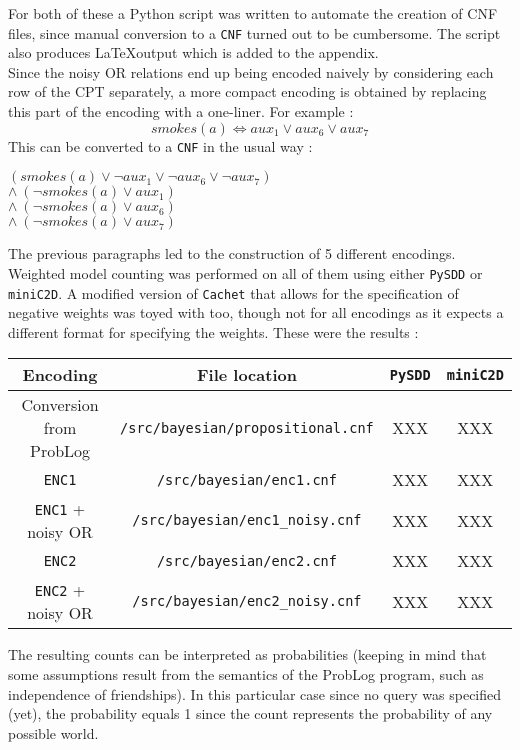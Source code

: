 \noindent For both of these a Python script was written to automate the creation of CNF files, since manual conversion to a \texttt{CNF} turned out to be cumbersome. The script also produces \LaTeX output which is added to the appendix.\\

\noindent Since the noisy OR relations end up being encoded naively by considering each row of the CPT separately, a more compact encoding is obtained by replacing this part of the encoding with a one-liner. For example :
$$smokes(a)\Leftrightarrow aux_1 \lor aux_6 \lor aux_7$$
\noindent This can be converted to a \texttt{CNF} in the usual way :\\\par\noindent
$(smokes(a) \lor \lnot aux_1\lor\lnot aux_6\lor\lnot aux_7)$\\
$\land\ (\lnot smokes(a) \lor aux_1)$\\
$\land\ (\lnot smokes(a) \lor aux_6)$\\
$\land\ (\lnot smokes(a) \lor aux_7)$



The previous paragraphs led to the construction of 5 different encodings. Weighted model counting was performed on all of them using either \texttt{PySDD} or \texttt{miniC2D}. A modified version of \texttt{Cachet} that allows for the specification of negative weights was toyed with too, though not for all encodings as it expects a different format for specifying the weights. These were the results :
\begin{center}
\begin{tabular}{cc|cc}
Encoding & File location & \texttt{PySDD} & \texttt{miniC2D} \\\hline
Conversion from ProbLog & \texttt{/src/bayesian/propositional.cnf} & XXX & XXX\\
\texttt{ENC1} & \texttt{/src/bayesian/enc1.cnf} & XXX & XXX\\
\texttt{ENC1} + noisy OR & \texttt{/src/bayesian/enc1\_noisy.cnf} & XXX & XXX\\
\texttt{ENC2} & \texttt{/src/bayesian/enc2.cnf} & XXX & XXX\\
\texttt{ENC2} + noisy OR & \texttt{/src/bayesian/enc2\_noisy.cnf} & XXX & XXX\\
\end{tabular}
\end{center}

\noindent The resulting counts can be interpreted as probabilities (keeping in mind that some assumptions result from the semantics of the ProbLog program, such as independence of friendships). In this particular case since no query was specified (yet), the probability equals 1 since the count represents the probability of any possible world.\\

